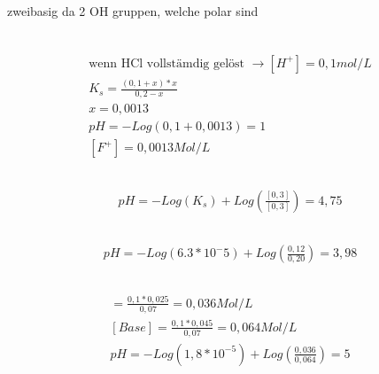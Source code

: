 \documentclass[a4paper]{article}
\begin{document}
\subsection{}
zweibasig da 2 OH gruppen, welche polar sind
\begin{align} 
\end{align}

\subsection{}
\begin{align}
  \text{wenn HCl vollstämdig gelöst } \rightarrow [H^+]=0,1 mol/L\\
  K_s = \frac{(0,1+x)*x}{0,2-x}\\
  x=0,0013\\
  pH=-Log(0,1+0,0013)=1\\
  [F^+]=0,0013 Mol/L
\end{align}

\subsection{}
\begin{align}
  pH = -Log(K_s) + Log(\frac{[0,3]}{[0,3]})=4,75
\end{align}

\subsection{}
\begin{align}
  pH = -Log(6.3*10^-5) + Log(\frac{0,12}{0,20})=3,98
\end{align}

\subsection{}
\begin{align}
  [\text{Säure}]=\frac{0,1*0,025}{0,07}=0,036 Mol/L\\
  [Base]=\frac{0,1*0,045}{0,07}=0,064 Mol/L\\
  pH=-Log(1,8*10^{-5})+Log(\frac{0,036}{0,064})=5
\end{align}

\subsection{}

\subsection{}
\end{document}

